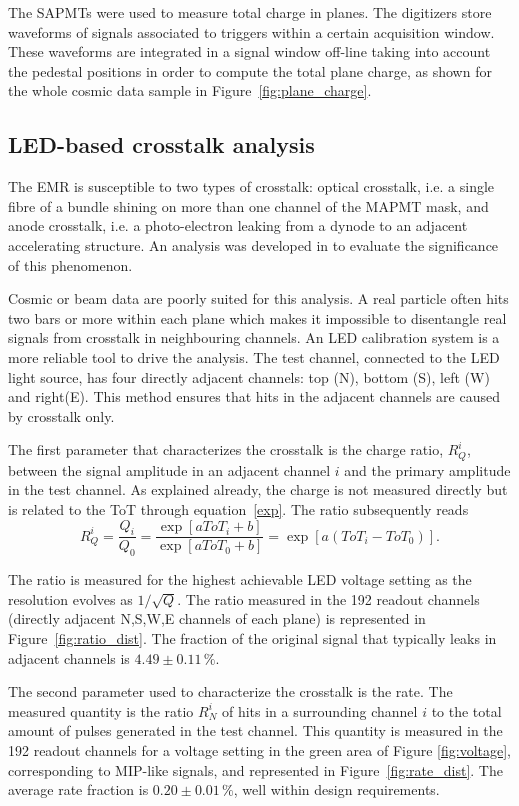 \documentclass[a4paper,11pt]{article}
\begin{document}
The SAPMTs were used to measure total charge in planes. The digitizers store waveforms of signals associated to triggers within a certain acquisition
window. These waveforms are integrated in a signal window off-line taking into account the pedestal positions in order to compute the total plane
charge, as shown for the whole cosmic data sample in Figure~\ref{fig:plane_charge}.

\subsection{LED-based crosstalk analysis}\label{sec_xt}
The EMR is susceptible to two types of crosstalk: optical crosstalk, i.e. a single fibre of a bundle shining on more than one channel of the MAPMT mask, and anode
crosstalk, i.e. a photo-electron leaking from a dynode to an adjacent accelerating structure. An analysis was developed in \cite{emr_xt, Francois} to evaluate the
significance of this phenomenon.

Cosmic or beam data are poorly suited for this analysis. A real particle often hits two bars or more within each plane which makes it impossible to disentangle
real signals from crosstalk in neighbouring channels. An LED calibration system is a more reliable tool to drive the analysis. The test channel, connected to the LED
light source, has four directly adjacent channels: top (N), bottom (S), left (W) and right(E). This method ensures that hits in the adjacent channels are caused
by crosstalk only.

The first parameter that characterizes the crosstalk is the charge ratio, $R_Q^i$, between the signal amplitude in an adjacent channel $i$ and the primary
amplitude in the test channel. As explained already, the charge is not measured directly but is related to the ToT through equation~\ref{exp}. The ratio
subsequently reads
\begin{equation}
R_Q^i=\frac{Q_i}{Q_0}=\frac{\exp[aToT_i+b]}{\exp[aToT_0+b]}=\exp\left[a(ToT_i-ToT_0)\right].
\end{equation}

The ratio is measured for the highest achievable LED voltage setting as the resolution evolves as $1/\sqrt{Q}$. The ratio measured in the 192 readout channels
(directly adjacent N,S,W,E channels of each plane) is represented in Figure~\ref{fig:ratio_dist}. The fraction of the original signal that typically leaks in
adjacent channels is $4.49\pm0.11\,\%$.

The second parameter used to characterize the crosstalk is the rate. The measured quantity is the ratio $R_N^i$ of hits in a surrounding channel $i$ to the
total amount of pulses generated in the test channel. This quantity is measured in the 192 readout channels for a voltage setting in the green area of Figure
\ref{fig:voltage}, corresponding to MIP-like signals, and represented in Figure~\ref{fig:rate_dist}. The average rate fraction is $0.20\pm0.01\,\%$, well within
design requirements.
\end{document}
